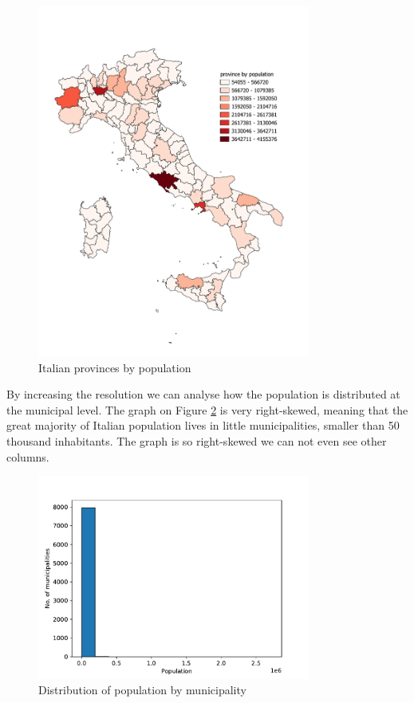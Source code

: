 \begin{figure}[tbp]
	\centering
	\includegraphics[width=0.8\textwidth]{img/province per popolazione.pdf}
	\caption{Italian provinces by population}
	\label{fig:pop_by_prov}
\end{figure}

By increasing the resolution we can analyse how the population is distributed at the municipal level.
The graph on Figure \ref{fig:pop_by_comm} is very right-skewed, meaning that the great majority of Italian population lives in little municipalities, smaller than 50 thousand inhabitants.
The graph is so right-skewed we can not even see other columns.



\begin{figure}[tbp]
	\centering
	\includegraphics[width=0.8\textwidth]{img/pop_by_comm_hist.pdf}
	\caption{Distribution of population by municipality}
	\label{fig:pop_by_comm}
\end{figure}

